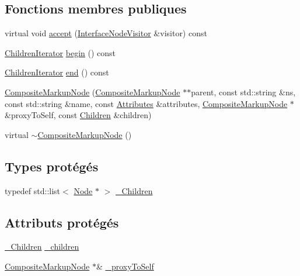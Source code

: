 \subsection*{Fonctions membres publiques}
\begin{DoxyCompactItemize}
\item 
virtual void \hyperlink{classxml_1_1_composite_markup_node_a6c61880592cc2e911517bb3e54c3c987}{accept} (\hyperlink{classxml_1_1_interface_node_visitor}{InterfaceNodeVisitor} \&visitor) const 
\item 
\hyperlink{classxml_1_1_composite_markup_node_abdd7123eab75fb90a4a95b1976693ed7}{ChildrenIterator} \hyperlink{classxml_1_1_composite_markup_node_a124753f641dc4612cee80fd289bf68a6}{begin} () const 
\item 
\hyperlink{classxml_1_1_composite_markup_node_abdd7123eab75fb90a4a95b1976693ed7}{ChildrenIterator} \hyperlink{classxml_1_1_composite_markup_node_aeebeee1fc877fe102bad454d2ffa5bba}{end} () const 
\item 
\hyperlink{classxml_1_1_composite_markup_node_a9f3c506e2b460608f2bc93d5288a7f92}{CompositeMarkupNode} (\hyperlink{classxml_1_1_composite_markup_node}{CompositeMarkupNode} $\ast$$\ast$parent, const std::string \&ns, const std::string \&name, const \hyperlink{classxml_1_1_markup_node_ade6f6045d18042d1a87f80f308f177fb}{Attributes} \&attributes, \hyperlink{classxml_1_1_composite_markup_node}{CompositeMarkupNode} $\ast$\&proxyToSelf, const \hyperlink{classxml_1_1_composite_markup_node_ac70e1fdb5fc2e0011378f7284c31fe5c}{Children} \&children)
\item 
virtual \hyperlink{classxml_1_1_composite_markup_node_a5f8800acf40291ab0cf1b098ae8b82f6}{$\sim$CompositeMarkupNode} ()
\end{DoxyCompactItemize}
\subsection*{Types protégés}
\begin{DoxyCompactItemize}
\item 
typedef std::list$<$ \hyperlink{classxml_1_1_node}{Node} $\ast$ $>$ \hyperlink{classxml_1_1_composite_markup_node_a48287f15a3192f936b0be50e1b2ea13e}{\_\-Children}
\end{DoxyCompactItemize}
\subsection*{Attributs protégés}
\begin{DoxyCompactItemize}
\item 
\hyperlink{classxml_1_1_composite_markup_node_a48287f15a3192f936b0be50e1b2ea13e}{\_\-Children} \hyperlink{classxml_1_1_composite_markup_node_a29a3971e681fe129d60f8ede9d05fb3e}{\_\-children}
\item 
\hyperlink{classxml_1_1_composite_markup_node}{CompositeMarkupNode} $\ast$\& \hyperlink{classxml_1_1_composite_markup_node_a237a9006a0fe8fb8c1b19c323fec4feb}{\_\-proxyToSelf}
\end{DoxyCompactItemize}


